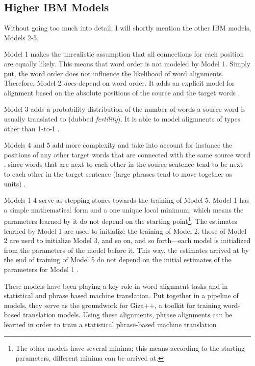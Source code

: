 \subsection{Higher IBM Models}
Without going too much into detail, I will shortly mention the other IBM models, Models 2-5. 

Model 1 makes the unrealistic assumption that all connections for each position are equally likely. 
This means that word order is not modeled by Model 1. 
Simply put, the word order does not influence the likelihood of word alignments.
Therefore, Model 2 \emph{does} depend on word order. 
It adds an explicit model for alignment based on the absolute positions of the source and the target words \autocites{brown-etal-1993-mathematics}[99]{koehn2009}.

Model 3 adds a probability distribution of the number of words a source word is usually translated to (dubbed \emph{fertility}). 
It is able to model alignments of types other than 1-to-1 \autocite[100]{koehn2009}. 

Models 4 and 5 add more complexity and take into account for instance the positions of any other target words that are connected with the same source word \autocite{brown-etal-1993-mathematics}, since words that are next to each other in the source sentence tend to be next to each other in the target sentence (large phrases tend to move together as units) \autocite[107]{koehn2009}.

Models 1-4 serve as stepping stones towards the training of Model 5. 
Model 1 has a simple mathematical form and a one unique local minimum, which means the parameters learned by it do not depend on the starting point\footnote{The other models have several minima; this means according to the starting parameters, different minima can be arrived at.}. 
The estimates learned by Model 1 are used to initialize the training of Model 2, those of Model 2 are used to initialize Model 3, and so on, and so forth---each model is initialized from the parameters of the model before it. 
This way, the estimates arrived at by the end of training of Model 5 do not depend  on the initial estimates of the parameters for Model 1 \autocite{brown-etal-1993-mathematics}. 

These models have been playing a key role in word alignment tasks and in statistical and phrase based machine translation. 
Put together in a pipeline of models, they serve as the groundwork for Giza++, a toolkit for training word-based translation models. 
Using these alignments, phrase alignments can be learned in order to train a statistical phrase-based machine translation \autocites{och-ney-2000-improved,och-ney-2003-smt}

